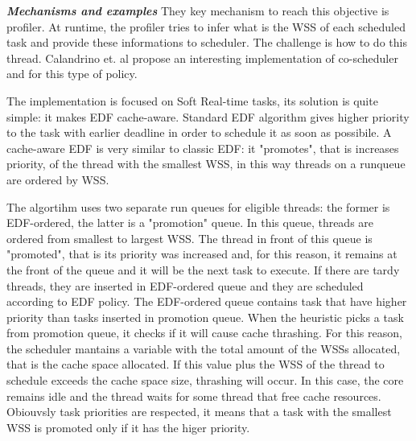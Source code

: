 \begin{description}
\textit{\textbf{Mechanisms and examples}} They key mechanism to reach this objective is profiler. At runtime, the profiler tries to infer what is the WSS 
of each scheduled task and provide these informations to scheduler. The challenge is how to do this thread. 
Calandrino et. al \cite{calandro} propose an interesting implementation of co-scheduler and for this type of policy.

The implementation is focused on Soft Real-time tasks, its solution is quite simple: it makes EDF cache-aware. Standard EDF algorithm gives higher priority 
to the task with earlier deadline in order to schedule it as soon as possibile. A cache-aware EDF is very similar to classic EDF: it "promotes", that is 
increases priority, of the thread with the smallest WSS, in this way threads on a runqueue are ordered by WSS.

The algortihm uses two separate run queues for eligible threads: the former is EDF-ordered, the latter is a "promotion" queue. In this queue, threads are ordered
from smallest to largest WSS. The thread in front of this queue is "promoted", that is its priority was increased and, for this reason, it remains at the front
of the queue and it will be the next task to execute. If there are tardy threads, they are inserted in EDF-ordered queue and they are scheduled according to 
EDF policy. The EDF-ordered queue contains task that have higher priority than tasks inserted in promotion queue.
When the heuristic picks a task from promotion queue, it checks if it will cause cache thrashing. For this reason, the scheduler mantains a variable with 
the total amount of the WSSs allocated, that is the cache space allocated. If this value plus the WSS of the thread to schedule exceeds the cache space size, 
thrashing will occur. In this case, the core remains idle and the thread waits for some thread that free cache resources.
Obiouvsly task priorities are respected, it means that a task with the smallest WSS is promoted only if it has the higer priority.


\end{description}
